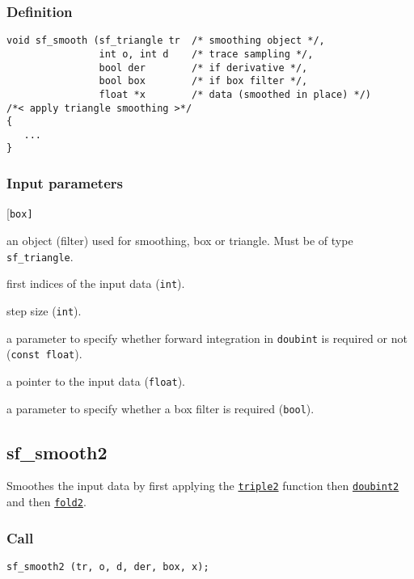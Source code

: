 \subsubsection*{Definition}
\begin{verbatim}
void sf_smooth (sf_triangle tr  /* smoothing object */, 
                int o, int d    /* trace sampling */, 
                bool der        /* if derivative */, 
                bool box        /* if box filter */,
                float *x        /* data (smoothed in place) */)
/*< apply triangle smoothing >*/
{
   ...   
}
\end{verbatim}

\subsubsection*{Input parameters}
\begin{desclist}{\tt }{\quad}[\tt box]
   \setlength\itemsep{0pt}
   \item[tr]  an object (filter) used for smoothing, box or triangle. Must be of type \texttt{sf\_triangle}. 
   \item[o]   first indices of the input data (\texttt{int}).  
   \item[d]   step size (\texttt{int}). 
   \item[der] a parameter to specify whether forward integration in \texttt{doubint} is required or not (\texttt{const float}).  
   \item[x]   a pointer to the input data (\texttt{float}). 
   \item[box] a parameter to specify whether a box filter is required (\texttt{bool}).
\end{desclist}  




\subsection{{sf\_smooth2}}
Smoothes the input data by first applying the \hyperref[sec:triple2]{\texttt{triple2}} function then \hyperref[sec:doubint2]{\texttt{doubint2}} and then \hyperref[sec:fold2]{\texttt{fold2}}.

\subsubsection*{Call}
\begin{verbatim}sf_smooth2 (tr, o, d, der, box, x);\end{verbatim}

